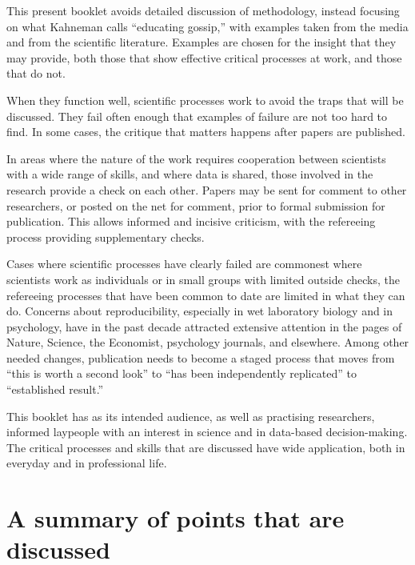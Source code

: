 \documentclass[
  10pt,
  b5paper]{book}
\begin{document}
This present booklet avoids detailed discussion of methodology,
instead focusing on what Kahneman calls ``educating gossip,'' with
examples taken from the media and from the scientific literature.
Examples are chosen for the insight that they may provide, both
those that show effective critical processes at work, and those
that do not.

When they function well, scientific processes work to avoid the
traps that will be discussed. They fail often enough that
examples of failure are not too hard to find. In some cases,
the critique that matters happens after papers are published.

In areas where the nature of the work requires cooperation between
scientists with a wide range of skills, and where data is shared,
those involved in the research provide a check on each other.
Papers may be sent for comment to other researchers, or posted on
the net for comment, prior to formal submission for publication.
This allows informed and incisive criticism, with the refereeing
process providing supplementary checks.

Cases where scientific processes have clearly failed are
commonest where scientists work as individuals or in small groups
with limited outside checks, the refereeing processes that have
been common to date are limited in what they can do. Concerns
about reproducibility, especially in wet laboratory biology and
in psychology, have in the past decade attracted extensive
attention in the pages of Nature, Science, the Economist,
psychology journals, and elsewhere. Among other needed changes,
publication needs to become a staged process that moves from
``this is worth a second look'' to ``has been independently
replicated'' to ``established result.''

This booklet has as its intended audience, as well as practising
researchers, informed laypeople with an interest in science and
in data-based decision-making. The critical processes and skills
that are discussed have wide application, both in everyday and
in professional life.

\hypertarget{a-summary-of-points-that-are-discussed}{%
\chapter*{A summary of points that are discussed}\label{a-summary-of-points-that-are-discussed}}
\end{document}
